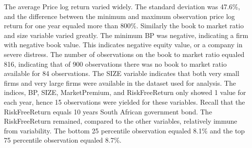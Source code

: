 The average Price log return varied widely. The standard deviation was 47.6\%, and the difference between the minimum and maximum observation price log return for one year equaled more than 800\%. Similarly the book to market ratio and size variable varied greatly. The minimum BP was negative, indicating a firm with negative book value. This indicates negative equity value, or a company in severe distress. The number of observations on the book to market ratio equaled 816, indicating that of 900 observations there was no book to market ratio available for 84 observations. The SIZE variable indicates that both very small firms and very large firms were available in the dataset used for analysis. The indices, BP, SIZE, MarketPremium, and RiskFreeReturn only showed 1 value for each year, hence 15 observations were yielded for these variables. Recall that the RiskFreeReturn equals 10 years South African government bond. The RiskFreeReturn remained, compared to the other variables,  relatively immune from variability. The bottom 25 percentile  observation equaled 8.1\% and the top 75 percentile observation equaled 8.7\%.

